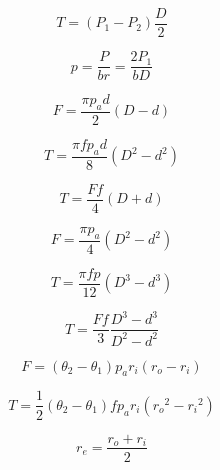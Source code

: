 \documentclass[12pt, letterpaper]{extarticle}
\begin{document}
\begin{equation*}
    T = (P_{1} - P_{2}) \frac{D}{2}
\end{equation*}

\begin{equation*}
    p = \frac{P}{br} = \frac{2P_{1}}{bD}
\end{equation*}



\begin{equation*}
    F = \frac{\pi p_{a}d}{2}(D - d)
\end{equation*}

\begin{equation*}
    T = \frac{\pi fp_{a}d}{8}(D^2 - d^2)
\end{equation*}

\begin{equation*}
    T = \frac{Ff}{4}(D + d)
\end{equation*}


\begin{equation*}
    F = \frac{\pi p_{a}}{4}(D^2 - d^2)
\end{equation*}

\begin{equation*}
    T = \frac{\pi fp}{12}(D^3 - d^3)
\end{equation*}

\begin{equation*}
    T = \frac{Ff}{3} \frac{D^3 - d^3}{D^2 - d^2}
\end{equation*}

\newpage
{}


\begin{equation*}
    F = (\theta_{2} - \theta_{1})p_{a}r_{i}(r_{o} - r_{i})
\end{equation*}

\begin{equation*}
    T = \frac{1}{2}(\theta_{2} - \theta_{1})fp_{a}r_{i}({r_{o}}^{2} - {r_{i}}^{2})
\end{equation*}

\begin{equation*}
    r_{e} = \frac{r_{o} + r_{i}}{2}
\end{equation*}
\end{document}
